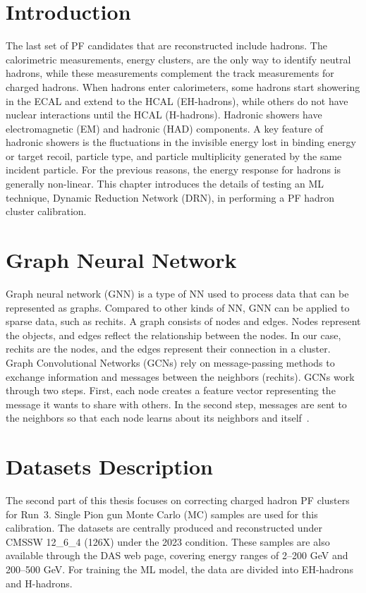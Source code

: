 \section{Introduction}
The last set of PF candidates that are reconstructed include hadrons.
The calorimetric measurements, energy clusters, are the only way to identify neutral hadrons, while these measurements complement the track measurements for charged hadrons.
When hadrons enter calorimeters, some hadrons start showering in the ECAL and extend to the HCAL (EH-hadrons), while others do not have nuclear interactions until the HCAL (H-hadrons).
Hadronic showers have electromagnetic (EM) and hadronic (HAD) components.
A key feature of hadronic showers is the fluctuations in the invisible energy lost in binding energy or target recoil, particle type, and particle multiplicity generated by the same incident particle. %
For the previous reasons, the energy response for hadrons is generally non-linear.
This chapter introduces the details of testing an ML technique, Dynamic Reduction Network (DRN), in performing a PF hadron cluster calibration.


\section{Graph Neural Network} %
Graph neural network (GNN) is a type of NN used to process data that can be represented as graphs.
Compared to other kinds of NN, GNN can be applied to sparse data, such as rechits.
A graph consists of nodes and edges. Nodes represent the objects, and edges reflect the relationship between the nodes.
In our case, rechits are the nodes, and the edges represent their connection in a cluster.
Graph Convolutional Networks (GCNs) rely on message-passing methods to exchange information and messages between the neighbors (rechits).
GCNs work through two steps. First, each node creates a feature vector representing the message it wants to share with others.
In the second step, messages are sent to the neighbors so that each node learns about its neighbors and itself~\cite{GNN}.

\section{Datasets Description}
The second part of this thesis focuses on correcting charged hadron PF clusters for Run~3.
Single Pion gun Monte Carlo (MC) samples are used for this calibration.
The datasets are centrally produced and reconstructed under CMSSW 12\_6\_4 (126X) under the 2023 condition.
These samples are also available through the DAS web page, covering energy ranges of 2--200 GeV and 200--500 GeV.
For training the ML model, the data are divided into EH-hadrons and H-hadrons.

